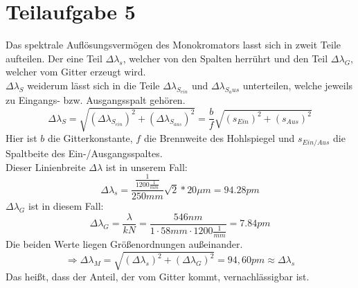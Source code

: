 

\section{Teilaufgabe 5}

Das spektrale Auflösungsvermögen des Monokromators lasst sich in zweit Teile aufteilen. Der eine Teil $\Delta \lambda _{s}$, welcher von den Spalten herrührt und 
den Teil $\Delta \lambda_{G}$, welcher vom Gitter erzeugt wird.\\
$ \Delta \lambda_{S}$ weiderum lässt sich in die Teile $ \Delta \lambda_{S_{ein}}$ und $ \Delta \lambda_{S_aus}$ unterteilen, welche jeweils zu Eingangs- bzw. Ausgangsspalt gehören.
\begin{equation}
     \Delta \lambda_{S} = \sqrt{(\Delta \lambda_{S_{ein}})^{2}+(\Delta \lambda_{S_{aus}})^{2}} = \frac{b}{f} \sqrt{(s_{Ein})^{2}+(s_{Aus})^{2}} 
\end{equation}
Hier ist $b$ die Gitterkonstante, $f$ die Brennweite des Hohlspiegel und $s_{Ein/Aus}$ die Spaltbeite des Ein-/Ausgangsspaltes.\\
Dieser Linienbreite $\Delta\lambda$ ist in unserem Fall:
\begin{equation}
    \Delta \lambda_{s} =\frac{\frac{1}{1200\frac{1}{mm} } }{250mm}  \sqrt{2} * 20 \mu m = 94.28 pm
\end{equation}
$\Delta \lambda _{G}$ ist in diesem Fall:
\begin{equation}
    \Delta \lambda _{G} = \frac{\lambda }{kN} = \frac{546nm}{1 \cdot 58mm \cdot1200\frac{1}{mm} } = 7.84 pm
\end{equation}
Die beiden Werte liegen Größenordnungen außeinander. 
\begin{equation}
    \Rightarrow \Delta \lambda _{M} =\sqrt{(\Delta \lambda_{s} )^{2}+(\Delta \lambda_{G})^2 }  = 94,60pm \approx \Delta \lambda_{s} 
\end{equation}
Das heißt, dass der Anteil, der vom Gitter kommt, vernachlässigbar ist.
